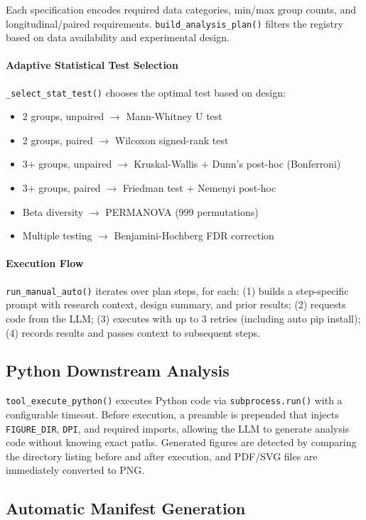 \documentclass[12pt, a4paper]{article}
\begin{document}
Each specification encodes required data categories, min/max group counts, and
longitudinal/paired requirements. \texttt{build\_analysis\_plan()} filters the registry
based on data availability and experimental design.

\paragraph{Adaptive Statistical Test Selection}
\texttt{\_select\_stat\_test()} chooses the optimal test based on design:
\begin{itemize}[nosep]
  \item 2 groups, unpaired $\to$ Mann-Whitney U test
  \item 2 groups, paired $\to$ Wilcoxon signed-rank test
  \item 3+ groups, unpaired $\to$ Kruskal-Wallis + Dunn's post-hoc (Bonferroni)
  \item 3+ groups, paired $\to$ Friedman test + Nemenyi post-hoc
  \item Beta diversity $\to$ PERMANOVA (999 permutations)
  \item Multiple testing $\to$ Benjamini-Hochberg FDR correction
\end{itemize}

\paragraph{Execution Flow}
\texttt{run\_manual\_auto()} iterates over plan steps, for each:
(1) builds a step-specific prompt with research context, design summary, and prior results;
(2) requests code from the LLM;
(3) executes with up to 3 retries (including auto pip install);
(4) records results and passes context to subsequent steps.

\subsection{Python Downstream Analysis}

\texttt{tool\_execute\_python()} executes Python code via
\texttt{subprocess.run()} with a configurable timeout.
Before execution, a preamble is prepended that injects
\texttt{FIGURE\_DIR}, \texttt{DPI}, and required imports,
allowing the LLM to generate analysis code without knowing exact paths.
Generated figures are detected by comparing the directory listing before
and after execution, and PDF/SVG files are immediately converted to PNG.

\subsection{Automatic Manifest Generation}
\end{document}
